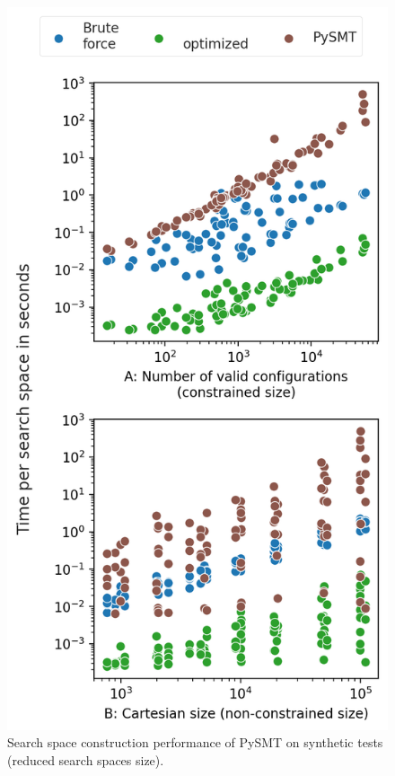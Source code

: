 \begin{figure}[!htb]
    \centering
    \includegraphics[width=0.95\linewidth]{ics25template/figures/searchspace_construction/results_synthetic_pysmt_100000.png}
    \caption{Search space construction performance of PySMT on synthetic tests (reduced search spaces size).}
    \label{fig:results_synthetic_pysmt}
\end{figure}

